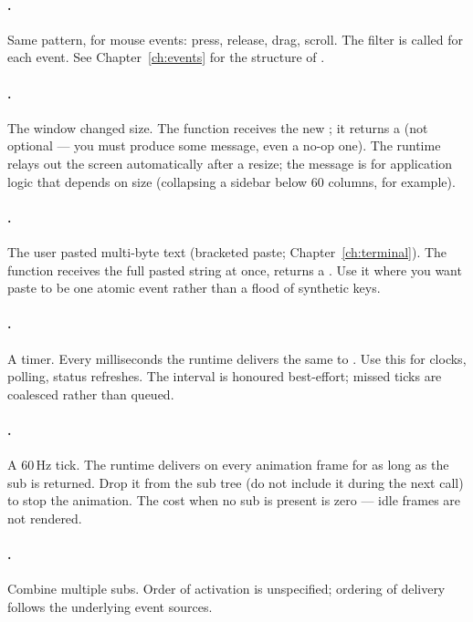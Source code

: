 \paragraph{.} Same pattern, for mouse events: press,
release, drag, scroll. The filter is called for each event. See
Chapter~\ref{ch:events} for the structure of .

\paragraph{.} The window changed size. The function
receives the new ; it returns a  (not
optional --- you must produce some message, even a no-op one). The
runtime relays out the screen automatically after a resize; the
message is for application logic that depends on size (collapsing a
sidebar below 60 columns, for example).

\paragraph{.} The user pasted multi-byte text
(bracketed paste; Chapter~\ref{ch:terminal}). The function receives
the full pasted string at once, returns a . Use it where
you want paste to be one atomic event rather than a flood of
synthetic  keys.

\paragraph{.} A timer. Every  milliseconds
the runtime delivers the same  to . Use this
for clocks, polling, status refreshes. The interval is honoured
best-effort; missed ticks are coalesced rather than queued.

\paragraph{.} A 60\,Hz tick. The runtime
delivers  on every animation frame for as long as the sub
is returned. Drop it from the sub tree (do not include it during
the next  call) to stop the animation. The cost
when no  sub is present is zero --- idle frames
are not rendered.

\paragraph{.} Combine multiple subs. Order of activation
is unspecified; ordering of delivery follows the underlying event
sources.

